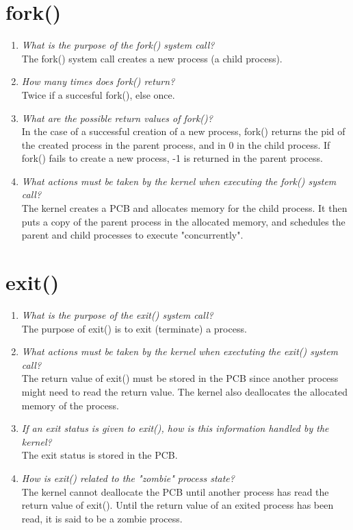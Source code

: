\documentclass[a4paper]{article}
\begin{document}
\section{fork()}
\begin{enumerate}
  \item \textit{What is the purpose of the fork() system call?} \\
    The fork() system call creates a new process (a child process).
  \item \textit{How many times does fork() return?} \\
    Twice if a succesful fork(), else once. 
  \item \textit{What are the possible return values of fork()?} \\
    In the case of a successful creation of a new process, fork() returns the pid of the created process in the parent process, and in 0 in the child process. If fork() fails to create a new process, -1 is returned in the parent process.
  \item \textit{What actions must be taken by the kernel when executing the fork() system call?} \\
    The kernel creates a PCB and allocates memory for the child process. It then puts a copy of the parent process in the allocated memory, and schedules the parent and child processes to execute "concurrently".
  
\end{enumerate}

\section{exit()}
\begin{enumerate}
  \item \textit{What is the purpose of the exit() system call?} \\
    The purpose of exit() is to exit (terminate) a process.
  \item \textit{What actions must be taken by the kernel when exectuting the exit() system call?} \\
    The return value of exit() must be stored in the PCB since another process might need to read the return value. The kernel also deallocates the allocated memory of the process. 
  \item \textit{If an exit status is given to exit(), how is this information handled by the kernel?} \\
    The exit status is stored in the PCB.
  \item \textit{How is exit() related to the  "zombie" process state?} \\
    The kernel cannot deallocate the PCB until another process has read the return value of exit(). Until the return value of an exited process has been read, it is said to be a zombie process.
  
\end{enumerate}
\end{document}
